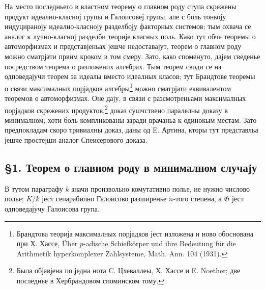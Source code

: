 ﻿\documentclass[11pt]{article}
\newcommand{\foreign}[1]{#1}
\providecommand{\Gg}{\mathfrak G}
\begin{document}
На место последньего в властном теорему о главном роду ступа скрежены продукт идеално-класној групы и Галоисовеј групы, але с боль тонкоју индуцираноју идеално-класноју разделбоју факторных системов; тым охвача се аналог к лучно-класној разделби теорије класных поль. Како тут обче теоремы о автоморфизмах и представјеньах јешче недоставајут, теорем о главном роду можно сматрјати првим кроком в том смеру. Зато, како споменуто, дајем сведенье посредством теорема о разложених алгебрах. Тым теорем своди се на одповедајучи теорем за идеалы вместо идеалных класов; тут Брандтове теоремы о связи максималных порјадков алгебры\footnote{Брандтова теорија максималных порјадков јест изложена и ново обоснована при Х. Хассе, \foreign{Über \(p\)-adische Schiefkörper und ihre Bedeutung für die Arithmetik hyperkomplexer Zahlsysteme}, Math. Ann. 104 (1931).} можно сматрјати еквивалентом теоремов о автоморфизмах. Оне дају, в связи с разсмотреньами максималных порјадков скрежених продуктов,\footnote{Была објавјена по једна нота C. Цхеваллеы, Х. Хассе и E. Noether; две последнье в Хербрандовом споминском тому.} доказ сушчствено паралелны доказу в минималном, хоти боль компликованы заради врачаньа к одинокым местам. Зато предпокладам скоро тривиалны доказ, даны од E. Артина, кторы тут представльа јешче простејши аналог Спеисерового доказа.

\subsection*{§1. Теорем о главном роду в минималном случају}

В тутом параграфу \(k\) значи произвольно комутативно полье, не нужно числово полье; \(K/k\) јест сепарабилно Галоисово разширенье \(n\)-того степена, а \(\Gg\) јест одповедајучу Галоисова група.
\end{document}
